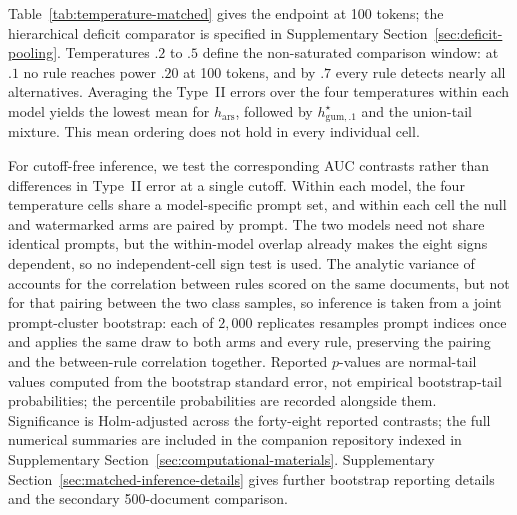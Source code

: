 \documentclass[11pt]{article}
\begin{document}
Table~\ref{tab:temperature-matched} gives the endpoint at 100 tokens; the hierarchical deficit comparator is specified in Supplementary Section~\ref{sec:deficit-pooling}.  Temperatures $.2$ to $.5$ define the non-saturated comparison window: at $.1$ no rule reaches power $.20$ at 100 tokens, and by $.7$ every rule detects nearly all alternatives.  Averaging the Type~II errors over the four temperatures within each model yields the lowest mean for $h_{\mathrm{ars}}$, followed by $h^\star_{\mathrm{gum},.1}$ and the union-tail mixture.  This mean ordering does not hold in every individual cell.

For cutoff-free inference, we test the corresponding AUC contrasts rather than differences in Type~II error at a single cutoff.  Within each model, the four temperature cells share a model-specific prompt set, and within each cell the null and watermarked arms are paired by prompt.  The two models need not share identical prompts, but the within-model overlap already makes the eight signs dependent, so no independent-cell sign test is used.  The analytic variance of \citet{delong1988comparing} accounts for the correlation between rules scored on the same documents, but not for that pairing between the two class samples, so inference is taken from a joint prompt-cluster bootstrap: each of $2{,}000$ replicates resamples prompt indices once and applies the same draw to both arms and every rule, preserving the pairing and the between-rule correlation together.  Reported $p$-values are normal-tail values computed from the bootstrap standard error, not empirical bootstrap-tail probabilities; the percentile probabilities are recorded alongside them.  Significance is Holm-adjusted across the forty-eight reported contrasts; the full numerical summaries are included in the companion repository indexed in Supplementary Section~\ref{sec:computational-materials}.  Supplementary Section~\ref{sec:matched-inference-details} gives further bootstrap reporting details and the secondary 500-document comparison.
\end{document}
